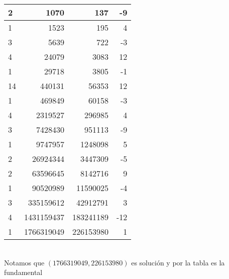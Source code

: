 \begin{sol}
\begin{enumerate}[label = (\roman*)]
\begin{tabular}{| l | r | r | r |}
			      \hline
			      2     & 1070       & 137       & -9   \\
			      \hline
			      1     & 1523       & 195       & 4    \\
			      \hline
			      3     & 5639       & 722       & -3   \\
			      \hline
			      4     & 24079      & 3083      & 12   \\
			      \hline
			      1     & 29718      & 3805      & -1   \\
			      \hline
			      14    & 440131     & 56353     & 12   \\
			      \hline
			      1     & 469849     & 60158     & -3   \\
			      \hline
			      4     & 2319527    & 296985    & 4    \\
			      \hline
			      3     & 7428430    & 951113    & -9   \\
			      \hline
			      1     & 9747957    & 1248098   & 5    \\
			      \hline
			      2     & 26924344   & 3447309   & -5   \\
			      \hline
			      2     & 63596645   & 8142716   & 9    \\
			      \hline
			      1     & 90520989   & 11590025  & -4   \\
			      \hline
			      3     & 335159612  & 42912791  & 3    \\
			      \hline
			      4     & 1431159437 & 183241189 & -12  \\
			      \hline
			      1     & 1766319049 & 226153980 & 1    \\
			      \hline
		      \end{tabular}\\
		      Notamos que $(1766319049,226153980)$ es solución y por la tabla es la fundamental
		      \newpage


\end{enumerate}
\end{sol}
